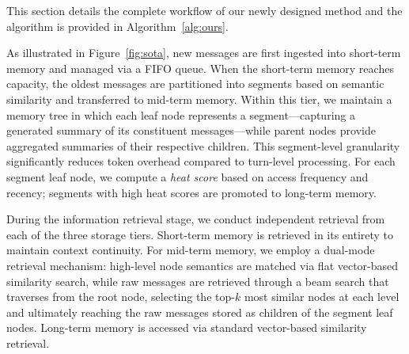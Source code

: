 This section details the complete workflow of our newly designed method and the algorithm is provided in Algorithm~\ref{alg:ours}.

As illustrated in Figure~\ref{fig:sota}, new messages are first ingested into short-term memory and managed via a FIFO queue. When the short-term memory reaches capacity, the oldest messages are partitioned into segments based on semantic similarity and transferred to mid-term memory. Within this tier, we maintain a memory tree in which each leaf node represents a segment---capturing a generated summary of its constituent messages---while parent nodes provide aggregated summaries of their respective children. This segment-level granularity significantly reduces token overhead compared to turn-level processing. For each segment leaf node, we compute a \emph{heat score} based on access frequency and recency; segments with high heat scores are promoted to long-term memory.

During the information retrieval stage, we conduct independent retrieval from each of the three storage tiers. Short-term memory is retrieved in its entirety to maintain context continuity. For mid-term memory, we employ a dual-mode retrieval mechanism: high-level node semantics are matched via flat vector-based similarity search, while raw messages are retrieved through a beam search that traverses from the root node, selecting the top-$k$ most similar nodes at each level and ultimately reaching the raw messages stored as children of the segment leaf nodes. Long-term memory is accessed via standard vector-based similarity retrieval.



